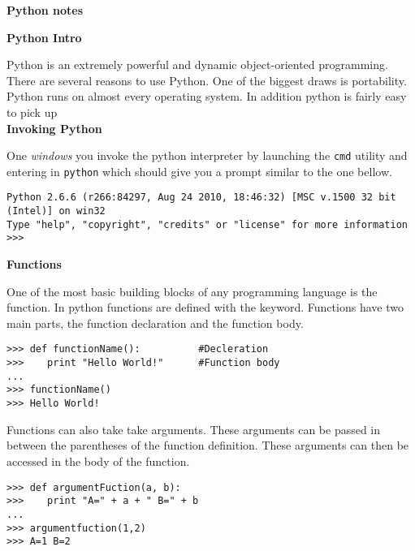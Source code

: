 \documentclass[letterpaper,11pt]{article}
\begin{document}
\begin{flushleft}
    \LARGE{\textbf{Python notes}}
\end{flushleft}
\textbf{Python Intro}
\par{Python is an extremely powerful and dynamic object-oriented programming.
There are several reasons to use Python. One of the biggest draws is
portability. Python runs on almost every operating system. In addition python is
fairly easy to pick up}
\\
\textbf{Invoking Python}
\par{One \emph{windows} you invoke the python interpreter by launching the
\texttt{cmd} utility and entering in \texttt{python} which should give you a
prompt similar to the one bellow.}
\begin{tcolorbox}
\begin{footnotesize}
\begin{verbatim}
Python 2.6.6 (r266:84297, Aug 24 2010, 18:46:32) [MSC v.1500 32 bit (Intel)] on win32
Type "help", "copyright", "credits" or "license" for more information
>>>
\end{verbatim}
\end{footnotesize}
\end{tcolorbox}
\textbf{Functions}
\par{One of the most basic building blocks of any programming language is the
function. In python functions are defined with the  keyword.
Functions have two main parts, the function declaration and the function body. }
\\
\begin{minipage}{.5\textwidth}
\begin{tcolorbox}
\begin{footnotesize}
\begin{verbatim}
>>> def functionName():          #Decleration
>>>    print "Hello World!"      #Function body
...
>>> functionName()
>>> Hello World!
\end{verbatim}
\end{footnotesize}
\end{tcolorbox}
\end{minipage}
\par{Functions can also take take arguments. These arguments can be passed in
between the parentheses of the function definition. These arguments can then be
accessed in the body of the function.}
\begin{minipage}{.5\textwidth}
\begin{tcolorbox}
\begin{footnotesize}
\begin{verbatim}
>>> def argumentFuction(a, b):
>>>    print "A=" + a + " B=" + b
...
>>> argumentfuction(1,2)
>>> A=1 B=2
\end{verbatim}
\end{footnotesize}
\end{tcolorbox}
\end{minipage}
\end{document}
